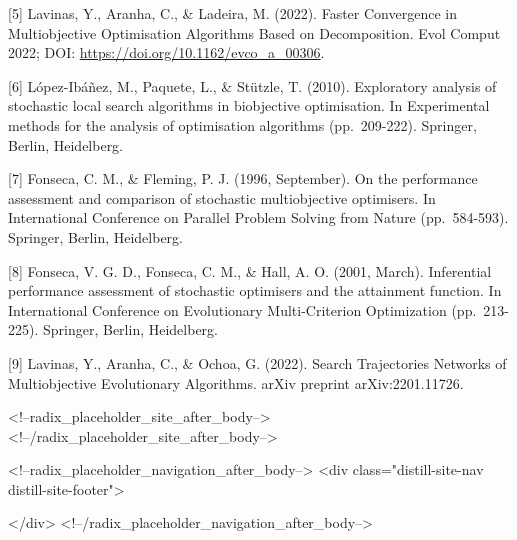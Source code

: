 \documentclass[
]{article}
\begin{document}
{[}5{]} Lavinas, Y., Aranha, C., \& Ladeira, M. (2022). Faster
Convergence in Multiobjective Optimisation Algorithms Based on
Decomposition. Evol Comput 2022; DOI:
\url{https://doi.org/10.1162/evco_a_00306}.

{[}6{]} López-Ibáñez, M., Paquete, L., \& Stützle, T. (2010).
Exploratory analysis of stochastic local search algorithms in
biobjective optimisation. In Experimental methods for the analysis of
optimisation algorithms (pp.~209-222). Springer, Berlin, Heidelberg.

{[}7{]} Fonseca, C. M., \& Fleming, P. J. (1996, September). On the
performance assessment and comparison of stochastic multiobjective
optimisers. In International Conference on Parallel Problem Solving from
Nature (pp.~584-593). Springer, Berlin, Heidelberg.

{[}8{]} Fonseca, V. G. D., Fonseca, C. M., \& Hall, A. O. (2001, March).
Inferential performance assessment of stochastic optimisers and the
attainment function. In International Conference on Evolutionary
Multi-Criterion Optimization (pp.~213-225). Springer, Berlin,
Heidelberg.

{[}9{]} Lavinas, Y., Aranha, C., \& Ochoa, G. (2022). Search
Trajectories Networks of Multiobjective Evolutionary Algorithms. arXiv
preprint arXiv:2201.11726.

<!--radix_placeholder_site_after_body-->
<!--/radix_placeholder_site_after_body-->

<!--radix_placeholder_navigation_after_body-->
<div class="distill-site-nav distill-site-footer">

</div>
<!--/radix_placeholder_navigation_after_body-->
\end{document}

